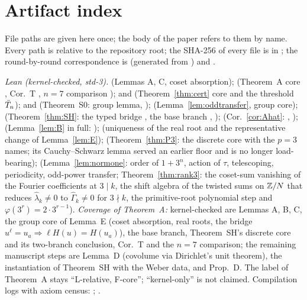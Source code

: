 \documentclass[11pt]{amsart}
\theoremstyle{remark}\newtheorem{remark}[theorem]{Remark}
\theoremstyle{definition}\newtheorem{definition}[theorem]{Definition}
\begin{document}
\section{Artifact index}\label{app:F}
File paths are given here once; the body of the paper refers to them by name. Every path is relative to the repository root; the SHA-256 of every file is in ; the round-by-round correspondence is  (generated from ) and .

\emph{Lean (kernel-checked, std-3).}  (Lemmas A, C, coset absorption);  (Theorem~A core , Cor.~T , $n=7$ comparison );  and  (Theorem~\ref{thm:cert} core and the threshold $\bar T_n$);  and  (Theorem~S0: group lemma, );  (Lemma~\ref{lem:oddtransfer}, group core);  (Theorem~\ref{thm:SH}: the typed bridge , the base branch , );  (Cor.~\ref{cor:Ahat}: , );  (Lemma~\ref{lem:B} in full: );  (uniqueness of the real root and the representative change of Lemma~\ref{lem:E});  (Theorem~\ref{thm:P3}: the discrete core with the $p=3$ names; its Cauchy--Schwarz lemma served an earlier floor and is no longer load-bearing);  (Lemma~\ref{lem:normone}: order of $1+3^n$, action of $\tau$, telescoping, periodicity, odd-power transfer; Theorem~\ref{thm:rank3}: the coset-sum vanishing of the Fourier coefficients at $3\mid k$, the shift algebra of the twisted sums on $\mathbb{Z}/N$ that reduces $\hat\lambda_k\ne0$ to $\hat\Gamma_k\ne0$ for $3\nmid k$, the primitive-root polynomial step and $\varphi(3^r)=2\cdot3^{r-1}$). \emph{Coverage of Theorem~A:} kernel-checked are Lemmas A, B, C, the group core of Lemma~E (coset absorption, real roots, the bridge $u^\ell=u_a\Rightarrow\ell H(u)=H(u_a)$), the base branch, Theorem~SH's discrete core and its two-branch conclusion, Cor.~T and the $n=7$ comparison; the remaining manuscript steps are Lemma~D (covolume via Dirichlet's unit theorem), the instantiation of Theorem~SH with the Weber data, and Prop.~D. The label of Theorem~A stays ``L-relative, F-core''; ``kernel-only'' is not claimed. Compilation logs with axiom census: ; .
\end{document}
